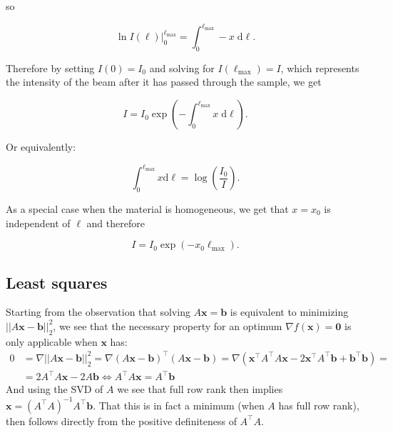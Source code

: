 \documentclass{article}
\begin{document}
so

\begin{equation}
    \ln{I(\ell)} \big|_{0}^{\ell_{\max}} = \int_{0}^{\ell_{\max}} -x \; \mathrm{d}\ell.
\end{equation}

Therefore by setting $I(0) = I_0$ and solving for $I(\ell_{\max}) = I$, which represents the intensity of the beam after it has passed through the sample, we get

\begin{equation}
    I = I_0 \exp{\left(-\int_{0}^{\ell_{\max}} x \; \mathrm{d}\ell \right)}.
\end{equation}

Or equivalently:

\begin{equation}
    \int_{0}^{\ell_{\max}}x \text{d} \ell = \log\left(\frac{I_0}{I}\right).
\end{equation}

As a special case when the material is homogeneous, we get that $x = x_0$ is independent of $\ell$ and therefore

\begin{equation}
    I = I_0 \exp{(-x_0 \ell_{\max})}.
\end{equation}

\subsection{Least squares}\label{appendix:least-squares}
Starting from the observation that solving $A\mathbf{x} = \mathbf{b}$ is equivalent to minimizing $||A\mathbf{x} - \mathbf{b}||_2^{2}$, we see that the necessary property for an optimum $\nabla f(\mathbf{x}) = \mathbf{0}$ is only applicable when $\mathbf{x}$ has:
\begin{align}
    0 &= \nabla ||A\mathbf{x} - \mathbf{b}||_2^{2} = \nabla (A\mathbf{x} - \mathbf{b})^\intercal (A\mathbf{x} - \mathbf{b}) = \nabla \left(\mathbf{x}^\intercal A^\intercal A \mathbf{x} - 2\mathbf{x}^\intercal A^\intercal \mathbf{b} + \mathbf{b}^\intercal \mathbf{b} \right) =  \\
    &= 2A^\intercal A \mathbf{x} - 2A\mathbf{b} \iff A^\intercal A \mathbf{x} = A^\intercal\mathbf{b}
\end{align}
And using the SVD of $A$ we see that full row rank then implies $\mathbf{x} = (A^\intercal A)^{-1} A^\intercal\mathbf{b}$. That this is in fact a minimum (when $A$ has full row rank), then follows directly from the positive definiteness of $A^\intercal A$.
\end{document}

